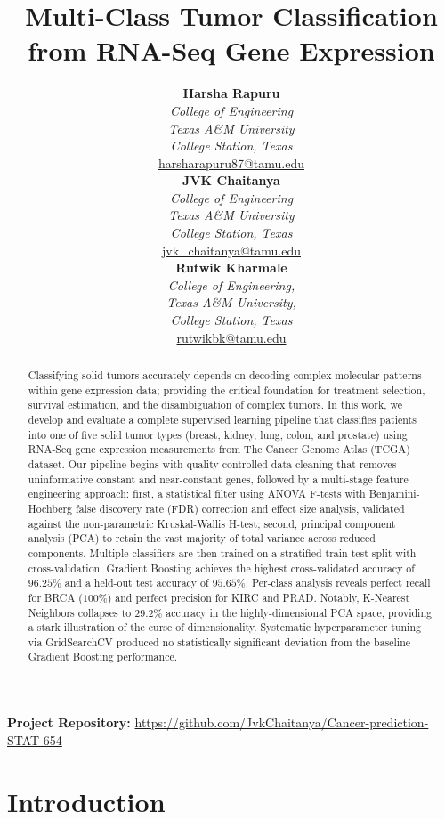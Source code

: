 \documentclass{article}
\title{\textbf{Multi-Class Tumor Classification from RNA-Seq Gene Expression}}
\author{
\begin{minipage}[t]{0.3\textwidth}
\centering
{\textbf{Harsha Rapuru}}\\
{\normalfont\textit{College of Engineering\\
Texas A\&M University\\
College Station, Texas}}\\
\normalfont\textcolor{blue}{\href{mailto:harsharapuru87@tamu.edu}{harsharapuru87@tamu.edu}}
\end{minipage}
\hfill
\begin{minipage}[t]{0.3\textwidth}
\centering
{\textbf{JVK Chaitanya}}\\
{\normalfont\textit{College of Engineering\\
Texas A\&M University\\
College Station, Texas}}\\
\normalfont\textcolor{blue}{\href{mailto:jvk_chaitanya@tamu.edu}{jvk\_chaitanya@tamu.edu}}
\end{minipage}
\hfill
\begin{minipage}[t]{0.33\textwidth}
\centering
{\textbf{Rutwik Kharmale}}\\
{\normalfont\textit{College of Engineering, \\Texas A\&M University,\\ College Station, Texas}}\\
\normalfont\textcolor{blue}{\href{mailto:rutwikbk@tamu.edu}{rutwikbk@tamu.edu}}
\end{minipage}
}
\date{} %
\begin{document}
\maketitle

\begin{center}
    \textbf{Project Repository:} \url{https://github.com/JvkChaitanya/Cancer-prediction-STAT-654} 
\end{center}


\begin{abstract}
\normalsize
Classifying solid tumors accurately depends on decoding complex molecular patterns within gene expression data; providing the critical foundation for treatment selection, survival estimation, and the disambiguation of complex tumors. In this work, we develop and evaluate a complete supervised learning pipeline that classifies patients into one of five solid tumor types (breast, kidney, lung, colon, and prostate) using RNA-Seq gene expression measurements from The Cancer Genome Atlas (TCGA) dataset. Our pipeline begins with quality-controlled data cleaning that removes uninformative constant and near-constant genes, followed by a multi-stage feature engineering approach: first, a statistical filter using ANOVA F-tests with Benjamini-Hochberg false discovery rate (FDR) correction and effect size analysis, validated against the non-parametric Kruskal-Wallis H-test; second, principal component analysis (PCA) to retain the vast majority of total variance across reduced components. Multiple classifiers are then trained on a stratified train-test split with cross-validation. Gradient Boosting achieves the highest cross-validated accuracy of $96.25\%$ and a held-out test accuracy of $95.65\%$. Per-class analysis reveals perfect recall for BRCA ($100\%$) and perfect precision for KIRC and PRAD. Notably, K-Nearest Neighbors collapses to $29.2\%$ accuracy in the highly-dimensional PCA space, providing a stark illustration of the curse of dimensionality. Systematic hyperparameter tuning via GridSearchCV produced no statistically significant deviation from the baseline Gradient Boosting performance.
\end{abstract}

\section{Introduction}
\end{document}
